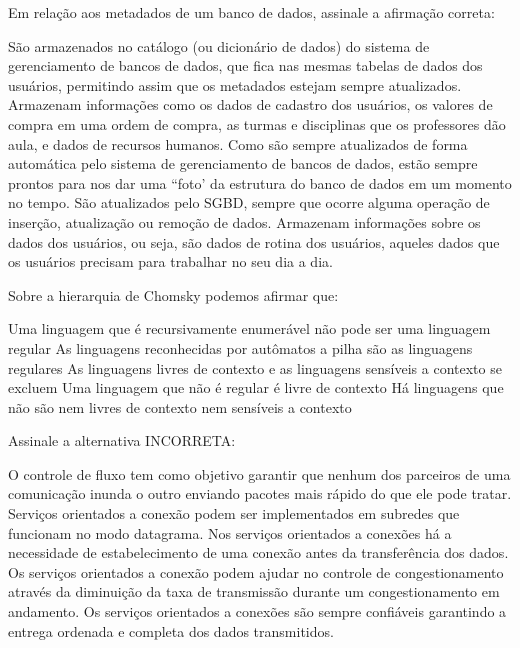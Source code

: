 \documentclass[12pt, addpoints]{exam}
\begin{document}
\begin{questions}
\question

Em relação aos metadados de um banco de dados, assinale a afirmação correta:
\begin{choices}
\choice São armazenados no catálogo (ou dicionário de dados) do sistema de gerenciamento de bancos de dados, que fica nas mesmas tabelas de dados dos usuários, permitindo assim que os metadados estejam sempre atualizados.
\choice Armazenam informações como os dados de cadastro dos usuários, os valores de compra em uma ordem de compra, as turmas e disciplinas que os professores dão aula, e dados de recursos humanos.
\choice Como são sempre atualizados de forma automática pelo sistema de gerenciamento de bancos de dados, estão sempre prontos para nos dar uma ``foto' da estrutura do banco de dados em um momento no tempo.
\choice São atualizados pelo SGBD, sempre que ocorre alguma operação de inserção, atualização ou remoção de dados.
\choice Armazenam informações sobre os dados dos usuários, ou seja, são dados de rotina dos usuários, aqueles dados que os usuários precisam para trabalhar no seu dia a dia.
\end{choices}

\question

Sobre a hierarquia de Chomsky podemos afirmar que:
\begin{choices}
\choice Uma linguagem que é recursivamente enumerável não pode ser uma linguagem regular
\choice As linguagens reconhecidas por autômatos a pilha são as linguagens regulares
\choice As linguagens livres de contexto e as linguagens sensíveis a contexto se excluem
\choice Uma linguagem que não é regular é livre de contexto
\choice Há linguagens que não são nem livres de contexto nem sensíveis a contexto
\end{choices}

\question

Assinale a alternativa INCORRETA:


\begin{choices}
\choice O controle de fluxo tem como objetivo garantir que nenhum dos parceiros de uma comunicação inunda o outro enviando pacotes mais rápido do que ele pode tratar.
\choice Serviços orientados a conexão podem ser implementados em subredes que funcionam no modo datagrama.
\choice Nos serviços orientados a conexões há a necessidade de estabelecimento de uma conexão antes da transferência dos dados.
\choice Os serviços orientados a conexão podem ajudar no controle de congestionamento através da diminuição da taxa de transmissão durante um congestionamento em andamento.
\choice Os serviços orientados a conexões são sempre confiáveis garantindo a entrega ordenada e completa dos dados transmitidos.
\end{choices}


\end{questions}
\end{document}
